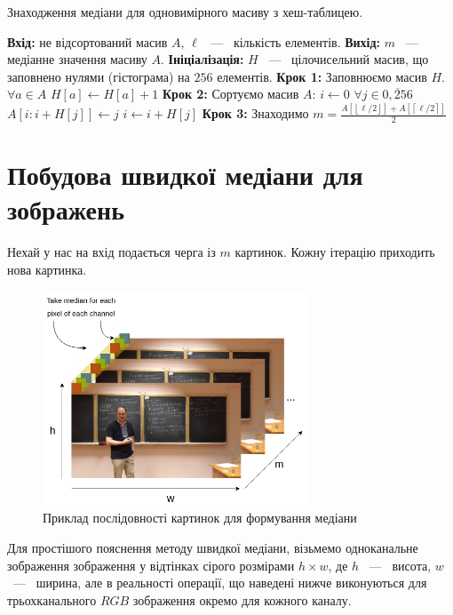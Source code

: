 \begin{algorithm}[H]
    \caption{Знаходження медіани для одновимірного масиву з хеш-таблицею.}
    \begin{algorithmic}
        \State \textbf{Вхід:} не відсортований масив $A$, $\ell$ ~---~ кількість елементів.
        \State \textbf{Вихід:} $m$ ~---~ медіанне значення масиву $A$.
        \State \textbf{Ініціалізація:} $H$ ~---~ цілочисельний масив, що заповнено нулями (гістограма) на $256$ елементів.
        \State \textbf{Крок 1:} Заповнюємо масив $H$.
        \State $\forall a \in A$
        \State \qquad $ H[a] \gets H[a] + 1 $
        \State \textbf{Крок 2:} Сортуємо масив $ A $:
        \State $ i \gets 0 $
        \State $ \forall j \in \overline{0,256} $
        \State \qquad  $ A[i:i+H[j]] \gets j $
        \State \qquad  $ i \gets i + H[j] $
        \State \textbf{Крок 3:} Знаходимо $m = \frac{A[  \left\lfloor \ell/2 \right\rfloor   ] + A[\left\lceil \ell/2 \right\rceil ]}{2} $
    \end{algorithmic}
    \label{al:median_hash}
\end{algorithm}

\section{Побудова швидкої медіани для зображень}

Нехай у нас на вхід подається черга із $m$ картинок. Кожну ітерацію приходить нова картинка.
\begin{figure}[H]
    \centering
    \includegraphics[width=0.7\textwidth]{images/median_seq}
    \caption{Приклад послідовності картинок для формування медіани \cite{yakovlev_numbers_theory_video}
        \label{fig:median_seq_example}
    }
\end{figure}
Для простішого пояснення методу швидкої медіани, візьмемо одноканальне зображення 
зображення у відтінках сірого розмірами $h \times w$, де $h$ ~---~ висота, $w$ ~---~ ширина, 
але в реальності операції, що наведені нижче виконуються для трьохканального $RGB$ зображення 
окремо для кожного каналу.

